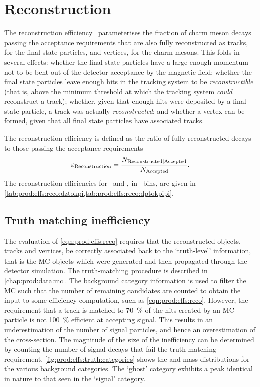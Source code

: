 \section{Reconstruction}
\label{chap:prod:effs:reco}

The reconstruction efficiency \effreco\ parameterises the fraction of charm 
meson decays passing the acceptance requirements that are also fully 
reconstructed as tracks, for the final state particles, and vertices, for the 
charm mesons.
This folds in several effects: whether the final state particles have a large 
enough momentum not to be bent out of the detector acceptance by the magnetic 
field; whether the final state particles leave enough hits in the tracking 
system to be \emph{reconstructible} (that is, above the minimum threshold at 
which the tracking system \emph{could} reconstruct a track); whether, given 
that enough hits were deposited by a final state particle, a track was actually 
\emph{reconstructed}; and whether a vertex can be formed, given that all final 
state particles have associated tracks.

The reconstruction efficiency is defined as the ratio of fully reconstructed 
decays to those passing the acceptance requirements
\begin{equation}
  \effreco = \frac{%
    N_{\text{Reconstructed}|\text{Accepted}}
  }
  {%
    N_{\text{\text{Accepted}}}
  }.
  \label{eqn:prod:effs:reco}
\end{equation}
The reconstruction efficiencies for \DzToKpi\ and \DpToKpipi, in \pTy\ bins, are 
given in \cref{tab:prod:effs:reco:dztokpi,tab:prod:effs:reco:dptokpipi}.

\subsection{Truth matching inefficiency}
\label{chap:prod:effs:truth}

The evaluation of \cref{eqn:prod:effs:reco} requires that the reconstructed 
objects, tracks and vertices, be correctly associated back to the `truth-level' 
information, that is the \ac{MC} objects which were generated and then 
propagated through the detector simulation.
The truth-matching procedure is described in \cref{chap:prod:data:mc}.
The background category information is used to filter the \ac{MC} such that the 
number of remaining candidates are counted to obtain the input to some 
efficiency computation, such as \cref{eqn:prod:effs:reco}.
However, the requirement that a track is matched to \SI{70}{\percent} of the 
hits created by an \ac{MC} particle is not \SI{100}{\percent} efficient at 
accepting signal.
This results in an underestimation of the number of signal particles, and hence 
an overestimation of the cross-section.
The magnitude of the size of the inefficiency can be determined by counting the 
number of signal decays that fail the truth matching requirement.
\cref{fig:prod:effs:truth:categories} shows the \PDzero and \PDplus mass 
distributions for the various background categories.
The `ghost' category exhibits a peak identical in nature to that seen in the 
`signal' category.

